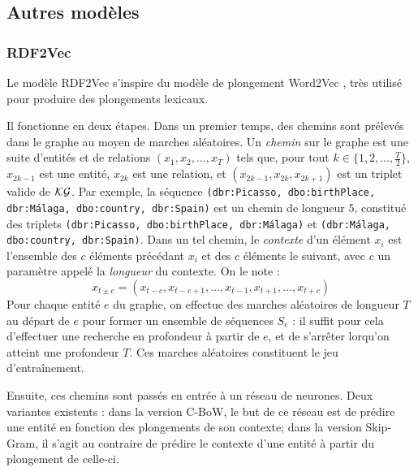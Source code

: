\FloatBarrier

\subsection{Autres modèles}
\label{subsec:kge-models-misc}

\subsubsection{RDF2Vec}

Le modèle RDF2Vec s'inspire du modèle de plongement Word2Vec \cite{mikolov2013distributed}, très utilisé pour produire des plongements lexicaux.

Il fonctionne en deux étapes. %
Dans un premier temps, des chemins sont prélevés dans le graphe au moyen de marches aléatoires.
Un \textit{chemin} sur le graphe est une suite d'entités et de relations $(x_1, x_2, \ldots, x_T)$ tels que, pour tout $k \in \{1, 2, \ldots, \frac{T}{2}\}$, $x_{2k-1}$ est une entité, $x_{2k}$ est une relation, et $(x_{2k-1}, x_{2k}, x_{2k+1})$ est un triplet valide de $\mathcal{KG}$. Par exemple, la séquence \texttt{(dbr:Picasso, dbo:birthPlace, dbr:Málaga, dbo:country, dbr:Spain)} est un chemin de longueur 5, constitué des triplets \texttt{(dbr:Picasso, dbo:birthPlace, dbr:Málaga)} et \texttt{(dbr:Málaga, \allowbreak dbo:country, dbr:Spain)}. 
Dans un tel chemin, le \textit{contexte} d'un élément $x_i$ est l'ensemble des $c$ éléments précédant $x_i$ et des $c$ éléments le suivant, avec $c$ un paramètre appelé la \textit{longueur}
du contexte. On le note :
 \begin{equation}
    x_{t \pm c} = (x_{t-c}, x_{t-c+1}, \ldots, x_{t-1}, x_{t+1}, \ldots, x_{t+c})
\end{equation}
 Pour chaque entité $e$ du graphe, on effectue des marches aléatoires de longueur $T$ au départ de $e$ pour former un ensemble de séquences $S_e$ : il suffit pour cela d'effectuer une recherche en profondeur à partir de $e$, et de s'arrêter lorqu'on atteint une profondeur $T$. Ces marches aléatoires constituent le jeu d'entraînement.


Ensuite, ces chemins sont passés en entrée à un réseau de neurones. Deux variantes existents : dans la version C-BoW, le but de ce réseau est de prédire une entité en fonction des plongements de son contexte; dans la version Skip-Gram, il s'agit au contraire de prédire le contexte d'une entité à partir du plongement de celle-ci.

